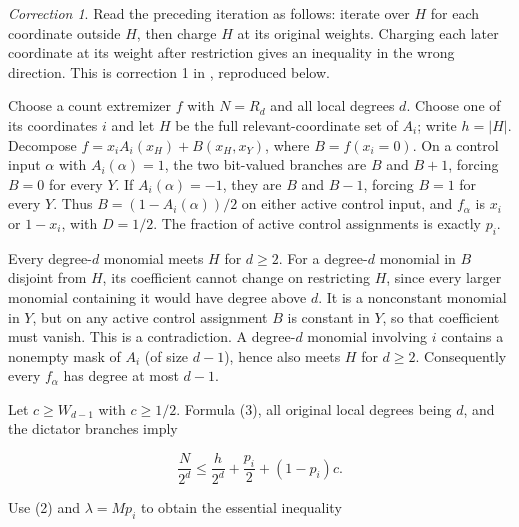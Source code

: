 \documentclass[11pt]{article}
\theoremstyle{remark}
\theoremstyle{correctionstyle}
\newtheorem*{correction}{Correction}
\begin{document}
\begin{correction}\label{correction-3}
Read the preceding iteration as follows: iterate over $H$ for each coordinate
outside $H$, then charge $H$ at its original weights. Charging each later
coordinate at its weight after restriction gives an inequality in the wrong
direction. This is correction 1 in , reproduced below.
\end{correction}
\leavevmode\label{src-p033}Choose a count extremizer $f$ with $N=R_d$ and all local degrees $d$. Choose
one of its coordinates $i$ and let $H$ be the full relevant-coordinate set of
$A_i$; write $h=|H|$. Decompose $f=x_iA_i(x_H)+B(x_H,x_Y)$, where
$B=f(x_i{=}0)$. On a control input $\alpha$ with $A_i(\alpha)=1$,
the two bit-valued branches are $B$ and $B+1$, forcing $B=0$ for every $Y$.
If $A_i(\alpha)=-1$, they are $B$ and $B-1$, forcing $B=1$ for every $Y$.
Thus $B=(1-A_i(\alpha))/2$ on either active control input, and $f_\alpha$
is $x_i$ or $1-x_i$, with $D=1/2$. The fraction of active control assignments
is exactly $p_i$.\label{src-end-p033}\par

\leavevmode\label{src-p034}Every degree-$d$ monomial meets $H$ for $d\ge2$. For a degree-$d$ monomial
in $B$ disjoint from $H$, its coefficient cannot change on restricting $H$,
since every larger monomial containing it would have degree above $d$.
It is a nonconstant monomial in $Y$, but on any active control assignment
$B$ is constant in $Y$, so that coefficient must vanish. This is a contradiction. A degree-$d$ monomial involving $i$ contains a nonempty
mask of $A_i$ (of size $d-1$), hence also meets $H$ for $d\ge2$. Consequently every
$f_\alpha$ has degree at most $d-1$.\label{src-end-p034}\par

\leavevmode\label{src-p035}Let $c\ge W_{d-1}$ with $c\ge1/2$. Formula (3), all original local degrees being $d$,
and the dictator branches imply\label{src-end-p035}\par

\begin{equation}
\frac{N}{2^d}\le\frac h{2^d}+\frac{p_i}{2}+(1-p_i)c.\tag*{}
\label{src-p036}
\end{equation}

\leavevmode\label{src-p037}Use (2) and $\lambda=Mp_i$ to obtain the essential inequality\label{src-end-p037}\par
\end{document}
